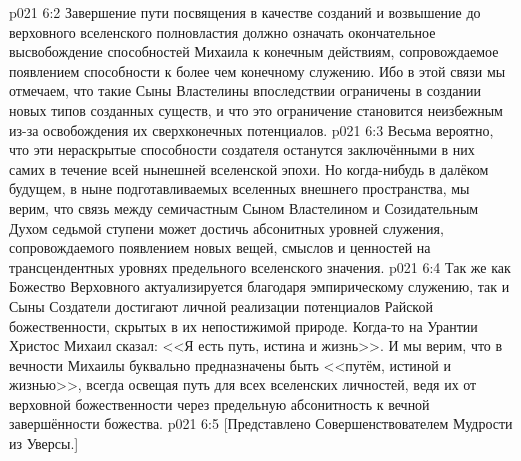 \vs p021 6:2 Завершение пути посвящения в качестве созданий и возвышение до верховного вселенского полновластия должно означать окончательное высвобождение способностей Михаила к конечным действиям, сопровождаемое появлением способности к более чем конечному служению. Ибо в этой связи мы отмечаем, что такие Сыны Властелины впоследствии ограничены в создании новых типов созданных существ, и что это ограничение становится неизбежным из\hyp{}за освобождения их сверхконечных потенциалов.
\vs p021 6:3 Весьма вероятно, что эти нераскрытые способности создателя останутся заключёнными в них самих в течение всей нынешней вселенской эпохи. Но когда\hyp{}нибудь в далёком будущем, в ныне подготавливаемых вселенных внешнего пространства, мы верим, что связь между семичастным Сыном Властелином и Созидательным Духом седьмой ступени может достичь абсонитных уровней служения, сопровождаемого появлением новых вещей, смыслов и ценностей на трансцендентных уровнях предельного вселенского значения.
\vs p021 6:4 Так же как Божество Верховного актуализируется благодаря эмпирическому служению, так и Сыны Создатели достигают личной реализации потенциалов Райской божественности, скрытых в их непостижимой природе. Когда\hyp{}то на Урантии Христос Михаил сказал: <<Я есть путь, истина и жизнь>>. И мы верим, что в вечности Михаилы буквально предназначены быть <<путём, истиной и жизнью>>, всегда освещая путь для всех вселенских личностей, ведя их от верховной божественности через предельную абсонитность к вечной завершённости божества.
\vsetoff
\vs p021 6:5 [Представлено Совершенствователем Мудрости из Уверсы.]
\quizlink
